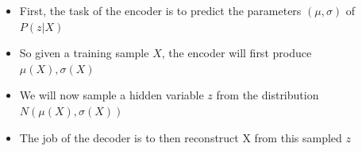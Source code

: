 \begin{frame}
\begin{columns}
\begin{overlayarea}{\textwidth}{\textheight}
		\end{overlayarea}
		\begin{overlayarea}{\textwidth}{\textheight}
			\begin{itemize}\justifying
				\item<1-> First, the task of the encoder is to predict the parameters $(\mu, \sigma)$ of $P(z|X)$
				\item<2-> So given a training sample $X$, the encoder will first produce $\mu(X), \sigma(X)$
				\item<3-> We will now sample a hidden variable $z$ from the distribution $N(\mu(X), \sigma(X))$
				\item<4-> The job of the decoder is to then reconstruct X from this sampled $z$
			\end{itemize}
		\end{overlayarea}
	\end{columns}
\end{frame}


